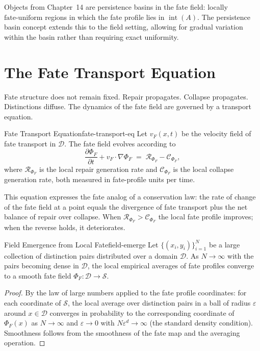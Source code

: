 \documentclass[12pt,twoside,openright]{book}
\newcommand{\fateSpace}{\mathcal{S}}
\newcommand{\admRegion}{A}
\newcommand{\fateUnif}{\text{fate-uniform}}
\providecommand{\admRegion}{A}
\providecommand{\fateUnif}{\text{fate-uniform}}
\providecommand{\fateField}{\Phi_{F}}
\providecommand{\fateVelField}{v_{F}}
\begin{document}
Objects from Chapter~14 are persistence basins in the fate
field: locally $\fateUnif$ regions in which the fate profile
lies in $\operatorname{int}(\admRegion)$. The persistence basin
concept extends this to the field setting, allowing for gradual
variation within the basin rather than requiring exact
uniformity.

\section{The Fate Transport Equation}

Fate structure does not remain fixed. Repair propagates.
Collapse propagates. Distinctions diffuse. The dynamics of the
fate field are governed by a transport equation.

\begin{definition}{Fate Transport Equation}{fate-transport-eq}
Let $\fateVelField(x,t)$ be the velocity field of fate
transport in $\mathcal{D}$. The fate field evolves according to
\[
  \frac{\partial\fateField}{\partial t}
  + \fateVelField\cdot\nabla\fateField
  \;=\;
  \mathcal{R}_{\fateField} - \mathcal{C}_{\fateField},
\]
where $\mathcal{R}_{\fateField}$ is the local repair generation
rate and $\mathcal{C}_{\fateField}$ is the local collapse
generation rate, both measured in fate-profile units per time.
\end{definition}

This equation expresses the fate analog of a conservation law:
the rate of change of the fate field at a point equals the
divergence of fate transport plus the net balance of repair
over collapse. When $\mathcal{R}_{\fateField}>\mathcal{C}_{\fateField}$
the local fate profile improves; when the reverse holds, it
deteriorates.

\begin{proposition}{Field Emergence from Local Fate}{field-emerge}
Let $\{(x_i, y_i)\}_{i=1}^N$ be a large collection of
distinction pairs distributed over a domain $\mathcal{D}$.
As $N\to\infty$ with the pairs becoming dense in $\mathcal{D}$,
the local empirical averages of fate profiles converge to a
smooth fate field $\fateField:\mathcal{D}\to\fateSpace$.
\begin{proof}
By the law of large numbers applied to the fate profile
coordinates: for each coordinate of $\fateSpace$, the local
average over distinction pairs in a ball of radius $\varepsilon$
around $x\in\mathcal{D}$ converges in probability to the
corresponding coordinate of $\fateField(x)$ as $N\to\infty$
and $\varepsilon\to 0$ with $N\varepsilon^d\to\infty$
(the standard density condition). Smoothness follows from
the smoothness of the fate map and the averaging operation.
\end{proof}
\end{proposition}
\end{document}
